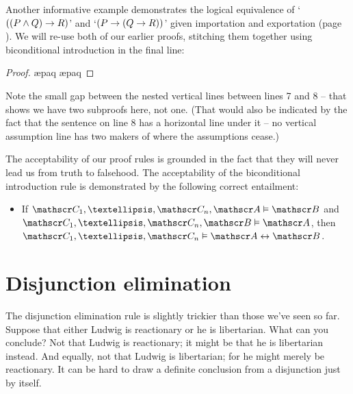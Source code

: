 Another informative example demonstrates the logical equivalence of `$((P \wedge Q) \rightarrow R)$' and `$(P \rightarrow (Q \rightarrow R))$' given importation and exportation (page \pageref{import.export}). We will re-use both of our earlier proofs, stitching them together using biconditional introduction in the final line: \begin{proof}
\open	{}
	\open
	\ae{paq}
	\ae{paq}
	\close
\close
\open
	\open
	\open
	\close
	\close
	\close
\end{proof}
Note the small gap between the nested vertical lines between lines 7 and 8 – that shows we have two subproofs here, not one. (That would also be indicated by the fact that the sentence on line 8 has a horizontal line under it – no vertical assumption line has two makers of where the assumptions cease.)



The acceptability of our proof rules is grounded in the fact that they will never lead us from truth to falsehood. The acceptability of the biconditional introduction rule is demonstrated by the following correct entailment: \begin{itemize}
	\item If $\meta{C}_{1},…,\meta{C}_{n},\meta{A}\vDash\meta{B}$ and $\meta{C}_{1},…,\meta{C}_{n},\meta{B}\vDash\meta{A}$, then $\meta{C}_{1},…,\meta{C}_{n}\vDash\meta{A}\eiff\meta{B}$.
\end{itemize}



\section{Disjunction elimination}\label{disjelim}


The disjunction elimination rule is slightly trickier than those we've seen so far. Suppose that either Ludwig is reactionary or he is libertarian. What can you conclude? Not that Ludwig is reactionary; it might be that he is libertarian instead. And equally, not that Ludwig is libertarian; for he might merely be reactionary. It can be hard to draw a definite conclusion from a disjunction just by itself.

